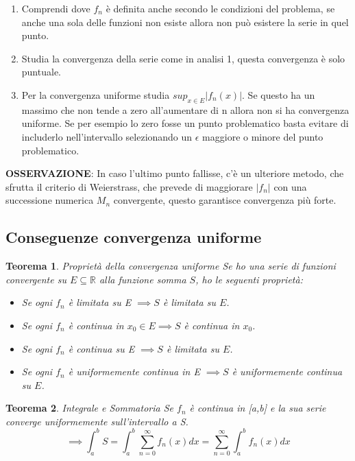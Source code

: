 \documentclass[a4paper]{article}
\newcommand{\numberset}{\mathbb}
\newcommand{\R}{\numberset{R}}
\theoremstyle{plain}
\newtheorem{Teo}{Teorema}
\begin{document}
\begin{enumerate}
    \item Comprendi dove $f_n$ è definita anche secondo le condizioni del problema,
    se anche una sola delle funzioni non esiste allora non può esistere la serie in quel punto.
    \item Studia la convergenza della serie come in analisi 1, questa convergenza è solo puntuale.
    \item Per la convergenza uniforme studia $sup_{x\in E}{|f_n(x)|}$. Se questo ha un massimo
    che non tende a zero all'aumentare di n allora non si ha convergenza uniforme. Se per esempio lo zero
    fosse un punto problematico basta evitare di includerlo nell'intervallo selezionando un $\epsilon$ maggiore o minore
    del punto problematico.
\end{enumerate}

\textbf{OSSERVAZIONE}: In caso l'ultimo punto fallisse, c'è un ulteriore metodo, che sfrutta il criterio
di Weierstrass, che prevede di maggiorare $|f_n|$ con una successione numerica $M_n$ convergente, questo garantisce 
convergenza più forte.

\subsection{Conseguenze convergenza uniforme}
\begin{Teo}{Proprietà della convergenza uniforme}
    Se ho una serie di funzioni convergente su $E\subseteq\R$ alla funzione somma $S$, 
    ho le seguenti proprietà:
    \begin{itemize}
        \item Se ogni $f_n$ è limitata su E $\implies S$ è limitata su $E$.
        \item Se ogni $f_n$ è continua in $x_0\in E\implies S$ è continua in $x_0$.
        \item Se ogni $f_n$ è continua su E $\implies S$ è limitata su $E$.
        \item Se ogni $f_n$ è uniformemente continua in E $\implies S$ è uniformemente continua su $E$.
    \end{itemize}
\end{Teo}
\begin{Teo}{Integrale e Sommatoria}
    Se $f_n$ è continua in [a,b] e la sua serie converge uniformemente sull'intervallo a S.
    $$\implies \int_a^b{S }=\int_a^b{\sum_{n=0}^\infty{f_n(x)}dx}=\sum_{n=0}^\infty{\int_a^b{f_n(x)dx}}$$
\end{Teo}
\end{document}
